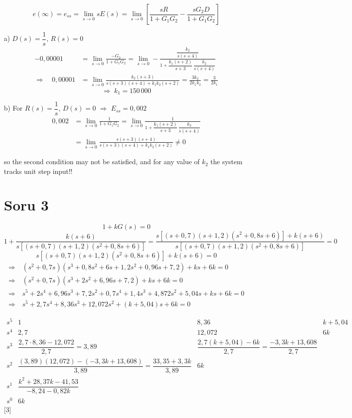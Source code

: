 \documentclass[11pt,a4paper]{article}
\begin{document}
\[
e(\infty) = e_{ss} = \lim_{s\to 0} sE(s) = \lim_{s\to 0}\left[\frac{sR}{1+G_1G_2} - \frac{s G_2 D}{1+G_1G_2}\right]
\]

a) $D(s)=\dfrac{1}{s}$, $R(s)=0$
\begin{align*}
-0{,}00001 &= \lim_{s\to 0} \frac{-G_2}{1+G_1G_2} = \lim_{s\to 0} -\frac{\dfrac{k_2}{s(s+4)}}{1+\dfrac{k_1(s+2)}{s+3}\,\dfrac{k_2}{s(s+4)}}\\
\Rightarrow\quad 0{,}00001 &= \lim_{s\to 0} \frac{k_2(s+3)}{s(s+3)(s+4)+k_1k_2(s+2)} = \frac{3k_2}{2k_1k_2} = \frac{3}{2k_1}
\end{align*}
\[ \Rightarrow\; k_1 = 150\,000 \]

b) For $R(s)=\dfrac{1}{s}$, $D(s)=0$ $\Rightarrow$ $E_{ss}=0{,}002$
\begin{align*}
0{,}002 &= \lim_{s\to 0}\frac{1}{1+G_1G_2} = \lim_{s\to 0}\frac{1}{1+\dfrac{k_1(s+2)}{s+3}\,\dfrac{k_2}{s(s+4)}}\\
&= \lim_{s\to 0}\frac{s(s+3)(s+4)}{s(s+3)(s+4)+k_1k_2(s+2)} \neq 0
\end{align*}

so the second condition may not be satisfied, and for any value of $k_2$ the system tracks unit step input!!

\section{Soru 3}

\[ 1 + kG(s) = 0 \]
\[
1+\frac{k(s+6)}{s[(s+0{,}7)(s+1{,}2)(s^2+0{,}8s+6)]}
= \frac{s[(s+0{,}7)(s+1{,}2)(s^2+0{,}8s+6)]+k(s+6)}{s[(s+0{,}7)(s+1{,}2)(s^2+0{,}8s+6)]} = 0
\]
\[ s[(s+0{,}7)(s+1{,}2)(s^2+0{,}8s+6)]+k(s+6)=0 \]
\begin{align*}
\Rightarrow\ & (s^2+0{,}7s)(s^3+0{,}8s^2+6s+1{,}2s^2+0{,}96s+7{,}2)+ks+6k=0\\
\Rightarrow\ & (s^2+0{,}7s)(s^3+2s^2+6{,}96s+7{,}2)+ks+6k=0\\
\Rightarrow\ & s^5+2s^4+6{,}96s^3+7{,}2s^2+0{,}7s^4+1{,}4s^3+4{,}872s^2+5{,}04s+ks+6k=0\\
\Rightarrow\ & s^5+2{,}7s^4+8{,}36s^3+12{,}072s^2+(k+5{,}04)s+6k=0
\end{align*}

\[
\begin{array}{c|ccc}
s^5 & 1 & 8{,}36 & k+5{,}04\\[4pt]
s^4 & 2{,}7 & 12{,}072 & 6k\\[4pt]
s^3 & \dfrac{2{,}7\cdot 8{,}36-12{,}072}{2{,}7}=3{,}89 & \dfrac{2{,}7(k+5{,}04)-6k}{2{,}7}=\dfrac{-3{,}3k+13{,}608}{2{,}7} & \\[10pt]
s^2 & \dfrac{(3{,}89)(12{,}072)-(-3{,}3k+13{,}608)}{3{,}89}=\dfrac{33{,}35+3{,}3k}{3{,}89} & 6k & \\[10pt]
s^1 & \dfrac{k^2+28{,}37k-41{,}53}{-8{,}24-0{,}82k} & & \\[10pt]
s^0 & 6k & &
\end{array}
\]
[3]
\end{document}
